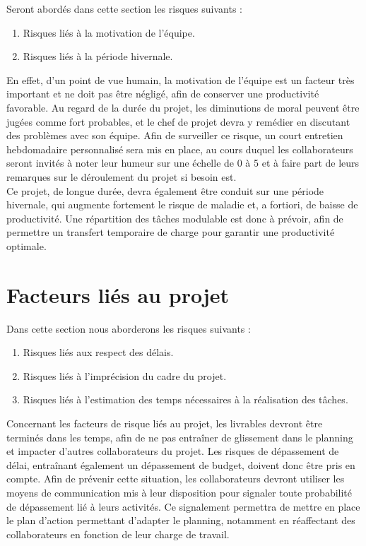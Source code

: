 Seront abordés dans cette section les risques suivants : \\
 
\begin{enumerate}
    \item Risques liés à la motivation de l'équipe.
    \item Risques liés à la période hivernale. \\
\end{enumerate}

En effet, d’un point de vue humain, la motivation de l’équipe est un facteur très important et ne doit pas être négligé, afin de conserver une productivité favorable. Au regard de la durée du projet, les diminutions de moral peuvent être jugées comme fort probables, et le chef de projet devra y remédier en discutant des problèmes avec son équipe. Afin de surveiller ce risque, un court entretien hebdomadaire personnalisé sera mis en place, au cours duquel les collaborateurs seront invités à noter leur humeur sur une échelle de 0 à 5 et à faire part de leurs remarques sur le déroulement du projet si besoin est. \\
 
Ce projet, de longue durée, devra également être conduit sur une période hivernale, qui augmente fortement le risque de maladie et, a fortiori, de baisse de productivité. Une répartition des tâches modulable est donc à prévoir, afin de permettre un transfert temporaire de charge pour garantir une productivité optimale. \\
 
\section{Facteurs liés au projet}
 
Dans cette section nous aborderons les risques suivants :

\begin{enumerate}
    \item Risques liés aux respect des délais.
    \item Risques liés à l'imprécision du cadre du projet.
    \item Risques liés à l'estimation des temps nécessaires à la réalisation des tâches. \\
\end{enumerate}
 
Concernant les facteurs de risque liés au projet, les livrables devront être terminés dans les temps, afin de ne pas entraîner de glissement dans le planning et impacter d’autres collaborateurs du projet. Les risques de dépassement de délai, entraînant également un dépassement de budget, doivent donc être pris en compte. Afin de prévenir cette situation, les collaborateurs devront utiliser les moyens de communication mis à leur disposition pour signaler toute probabilité de dépassement lié à leurs activités. Ce signalement permettra de mettre en place le plan d’action permettant d’adapter le planning, notamment en réaffectant des collaborateurs en fonction de leur charge de travail. \\
 
